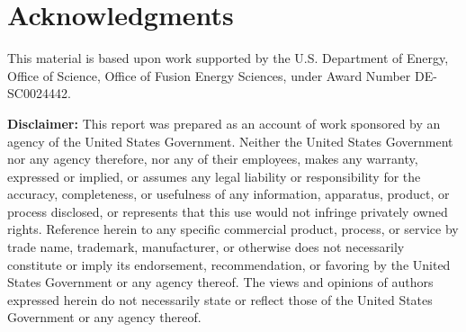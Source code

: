 \documentclass[../HDF5_RFC.tex]{subfiles}
\begin{document}
\section*{Acknowledgments}
\label{acknowledgements}


This material is based upon work supported by the U.S. Department of Energy, Office of Science, Office of
Fusion Energy Sciences, under Award Number DE-SC0024442.

\textbf{Disclaimer:} This report was prepared as an account of work sponsored by an agency of the United
States Government. Neither the United States Government nor any agency therefore, nor any of their employees,
makes any warranty, expressed or implied, or assumes any legal liability or responsibility for the accuracy,
completeness, or usefulness of any information, apparatus, product, or process disclosed, or represents that
this use would not infringe privately owned rights. Reference herein to any specific commercial product,
process, or service by trade name, trademark, manufacturer, or otherwise does not necessarily constitute or
imply its endorsement, recommendation, or favoring by the United States Government or any agency thereof.
The views and opinions of authors expressed herein do not necessarily state or reflect those of the United
States Government or any agency thereof.
\end{document}
